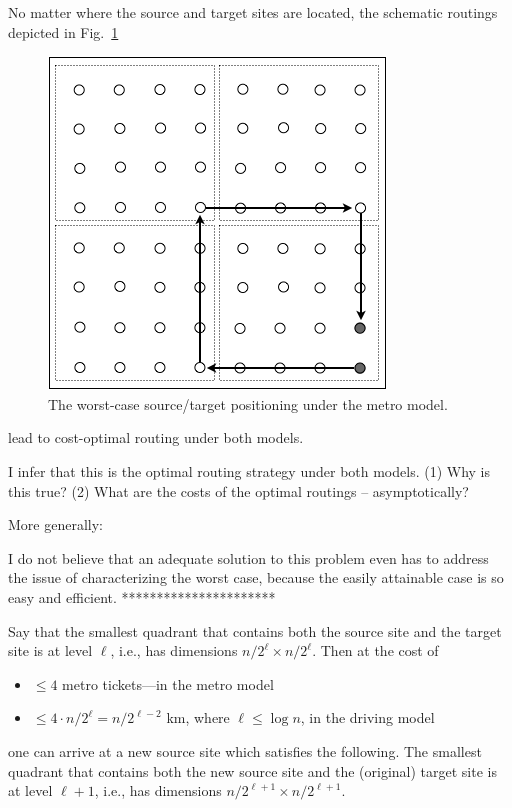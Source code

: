 \begin{itemize}
{{No matter where the source and target sites are located, the schematic routings depicted in
Fig.~\ref{fig:routingCitySolution} 
\begin{figure}[hbt]
\begin{center}
       \includegraphics[scale=0.35]{FiguresGraph/routingCitySolution}
       \caption{The worst-case source/target positioning under the metro model.}
  \label{fig:routingCitySolution}
\end{center}
\end{figure}
lead to cost-optimal routing under both models.

{\Arny I infer that this is the optimal routing strategy under both models.  (1) Why is this true?  (2) What are the costs of the optimal routings -- asymptotically?}

More generally:

I do not believe that an adequate solution to this problem even has to address the issue of characterizing the worst case, because the easily attainable case is so easy and efficient.
**********************}

Say that the smallest quadrant that contains both the source site and the target site is at level $\ell$, i.e., has dimensions $n/2^\ell \times n/2^\ell$.  Then at the cost of

\begin{itemize}
\item
$\leq 4$ metro tickets---in the metro model
\item
$\leq 4 \cdot n/2^\ell = n/2^{\ell -2}$ km, where $\ell \leq \log n$, in the driving model
\end{itemize}
one can arrive at a new source site which satisfies the following.  The smallest quadrant that contains both the new source site and the (original) target site is at level $\ell +1$, i.e., has dimensions $n/2^{\ell +1} \times n/2^{\ell +1}$.

}
\end{itemize}
